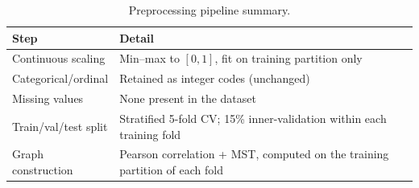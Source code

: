 \begin{table}[t]
\centering
\caption{Preprocessing pipeline summary.}
\label{tab:prep}
\small
\begin{tabular}{p{2.4cm}p{5.4cm}}
\toprule
Step & Detail \\
\midrule
Continuous scaling & Min--max to $[0,1]$, fit on training partition only \\
Categorical/ordinal & Retained as integer codes (unchanged) \\
Missing values & None present in the dataset \\
Train/val/test split & Stratified 5-fold CV; 15\% inner-validation within each training fold \\
Graph construction & Pearson correlation + MST, computed on the training partition of each fold \\
\bottomrule
\end{tabular}
\end{table}
